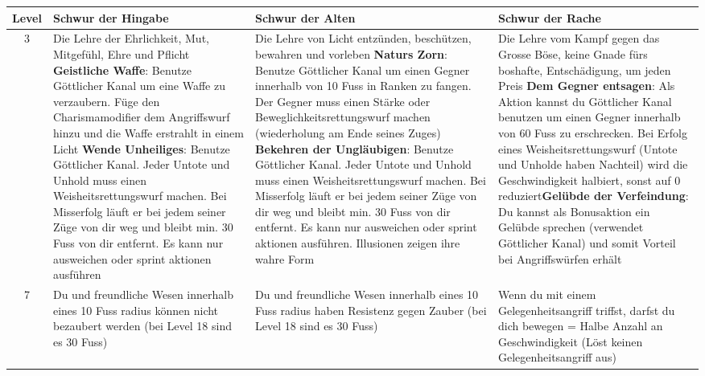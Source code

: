 \begin{table}
	\centering
	\begin{tabular}{cp{6cm}p{6cm}p{6cm}}
	\textbf{Level} & \textbf{Schwur der Hingabe} & \textbf{Schwur der Alten} & \textbf{Schwur der Rache}\\ \hline

	3 &
	Die Lehre der Ehrlichkeit, Mut, Mitgefühl, Ehre und Pflicht\linebreak\linebreak
	\textbf{Geistliche Waffe}: Benutze Göttlicher Kanal um eine Waffe zu verzaubern. Füge den Charismamodifier dem Angriffswurf hinzu und die Waffe erstrahlt in einem Licht\linebreak
	\textbf{Wende Unheiliges}: Benutze Göttlicher Kanal. Jeder Untote und Unhold muss einen Weisheitsrettungswurf machen. Bei Misserfolg läuft er bei jedem seiner Züge von dir weg und bleibt min. 30 Fuss von dir entfernt. Es kann nur ausweichen oder sprint aktionen ausführen&
	Die Lehre von Licht entzünden, beschützen, bewahren und vorleben\linebreak\linebreak
	\textbf{Naturs Zorn}: Benutze Göttlicher Kanal um einen Gegner innerhalb von 10 Fuss in Ranken zu fangen. Der Gegner muss einen Stärke oder Beweglichkeitsrettungswurf machen (wiederholung am Ende seines Zuges)\linebreak
	\textbf{Bekehren der Ungläubigen}: Benutze Göttlicher Kanal. Jeder Untote und Unhold muss einen Weisheitsrettungswurf machen. Bei Misserfolg läuft er bei jedem seiner Züge von dir weg und bleibt min. 30 Fuss von dir entfernt. Es kann nur ausweichen oder sprint aktionen ausführen. Illusionen zeigen ihre wahre Form&
	Die Lehre vom Kampf gegen das Grosse Böse, keine Gnade fürs boshafte, Entschädigung, um jeden Preis\linebreak\linebreak
	\textbf{Dem Gegner entsagen}: Als Aktion kannst du Göttlicher Kanal benutzen um einen Gegner innerhalb von 60 Fuss zu erschrecken. Bei Erfolg eines Weisheitsrettungswurf (Untote und Unholde haben Nachteil) wird die Geschwindigkeit halbiert, sonst auf 0 reduziert\linebreak\textbf{Gelübde der Verfeindung}: Du kannst als Bonusaktion ein Gelübde sprechen (verwendet Göttlicher Kanal) und somit Vorteil bei Angriffswürfen erhält\\ \hline

	7 &
	Du und freundliche Wesen innerhalb eines 10 Fuss radius können nicht bezaubert werden (bei Level 18 sind es 30 Fuss)&
	Du und freundliche Wesen innerhalb eines 10 Fuss radius haben Resistenz gegen Zauber (bei Level 18 sind es 30 Fuss)&
	Wenn du mit einem Gelegenheitsangriff triffst, darfst du dich bewegen = Halbe Anzahl an Geschwindigkeit (Löst keinen Gelegenheitsangriff aus)\\ \hline
	

\end{tabular}
\end{table}
